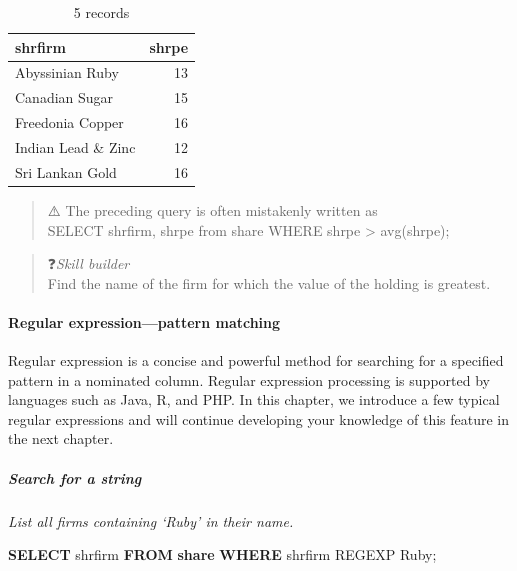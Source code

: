 \documentclass[
]{article}
\newenvironment{Shaded}{\begin{snugshade}}{\end{snugshade}}
\newcommand{\KeywordTok}[1]{\textcolor[rgb]{0.13,0.29,0.53}{\textbf{#1}}}
\newcommand{\NormalTok}[1]{#1}
\newcommand{\StringTok}[1]{\textcolor[rgb]{0.31,0.60,0.02}{#1}}
\begin{document}
\begin{table}

\caption{\label{tab:unnamed-chunk-27}5 records}
\centering
\begin{tabular}[t]{l|r}
\hline
shrfirm & shrpe\\
\hline
Abyssinian Ruby & 13\\
\hline
Canadian Sugar & 15\\
\hline
Freedonia Copper & 16\\
\hline
Indian Lead \& Zinc & 12\\
\hline
Sri Lankan Gold & 16\\
\hline
\end{tabular}
\end{table}

\begin{quote}
⚠️ The preceding query is often mistakenly written as\\
SELECT shrfirm, shrpe from share WHERE shrpe \textgreater{} avg(shrpe);
\end{quote}

\begin{quote}
❓\emph{Skill builder}\\
Find the name of the firm for which the value of the holding is greatest.
\end{quote}

\hypertarget{regular-expressionpattern-matching}{%
\paragraph*{Regular expression---pattern matching}\label{regular-expressionpattern-matching}}

Regular expression is a concise and powerful method for searching for a specified pattern in a nominated column. Regular expression processing is supported by languages such as Java, R, and PHP. In this chapter, we introduce a few typical regular expressions and will continue developing your knowledge of this feature in the next chapter.

\hypertarget{search-for-a-string}{%
\subparagraph*{Search for a string}\label{search-for-a-string}}

\emph{List all firms containing `Ruby' in their name.}

\begin{Shaded}
\begin{Highlighting}[]
\KeywordTok{SELECT}\NormalTok{ shrfirm }\KeywordTok{FROM} \KeywordTok{share} \KeywordTok{WHERE}\NormalTok{ shrfirm REGEXP }\StringTok{\textquotesingle{}Ruby\textquotesingle{}}\NormalTok{;}
\end{Highlighting}
\end{Shaded}
\end{document}
